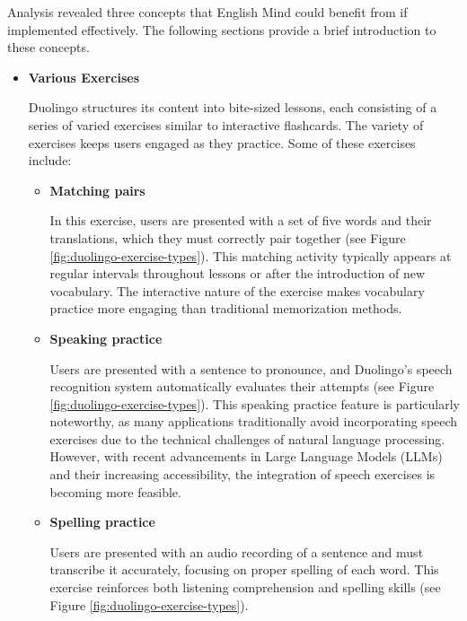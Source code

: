 Analysis revealed three concepts that English Mind could benefit from if implemented effectively. The following sections provide a brief introduction to these concepts.

\begin{itemize}
    \item \textbf{Various Exercises}

    Duolingo structures its content into bite-sized lessons, each consisting of a series of varied exercises similar to interactive flashcards. The variety of exercises keeps users engaged as they practice. Some of these exercises include:

    \begin{itemize}
        \item \textbf{Matching pairs}

        In this exercise, users are presented with a set of five words and their translations, which they must correctly pair together (see Figure \ref{fig:duolingo-exercise-types}). This matching activity typically appears at regular intervals throughout lessons or after the introduction of new vocabulary. The interactive nature of the exercise makes vocabulary practice more engaging than traditional memorization methods.
        
        \item \textbf{Speaking practice}

        Users are presented with a sentence to pronounce, and Duolingo's speech recognition system automatically evaluates their attempts (see Figure \ref{fig:duolingo-exercise-types}). This speaking practice feature is particularly noteworthy, as many applications traditionally avoid incorporating speech exercises due to the technical challenges of natural language processing. However, with recent advancements in Large Language Models (LLMs) and their increasing accessibility, the integration of speech exercises is becoming more feasible.
        
        \item \textbf{Spelling practice}

        Users are presented with an audio recording of a sentence and must transcribe it accurately, focusing on proper spelling of each word. This exercise reinforces both listening comprehension and spelling skills (see Figure \ref{fig:duolingo-exercise-types}).
    \end{itemize}


\end{itemize}
